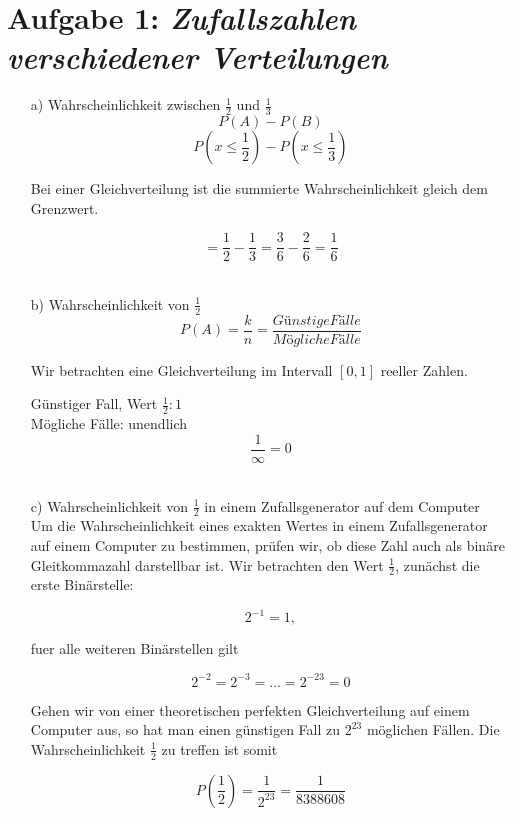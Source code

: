  

\section*{Aufgabe 1: \emph{Zufallszahlen verschiedener Verteilungen}}

\begin{itemize}
\item[a)] Wahrscheinlichkeit zwischen $\frac{1}{2}$ und $\frac{1}{3}$ \\

\[
P\left(A\right) - P\left(B\right)
\]
\[
P\left(x \le \frac{1}{2}\right) - P\left(x \le \frac{1}{3}\right)
\]

Bei einer Gleichverteilung ist die summierte Wahrscheinlichkeit gleich dem Grenzwert.

\[
= \frac{1}{2} - \frac{1}{3} = \frac{3}{6} - \frac{2}{6} = \frac{1}{6}
\]
 \\

\item[b)] Wahrscheinlichkeit von $\frac{1}{2}$ \\

\[
P(A) = \frac{k}{n} = \frac{Günstige Fälle} {Mögliche Fälle}
\]

Wir betrachten eine Gleichverteilung im Intervall $[0,1]$ reeller Zahlen.

Günstiger Fall, Wert $\frac{1}{2}: 1$ \\
Mögliche Fälle: unendlich
\[
\frac{1}{\infty} = 0
\]
\\

\item[c)] Wahrscheinlichkeit von $\frac{1}{2}$ in einem Zufallsgenerator auf dem Computer \\

Um die Wahrscheinlichkeit eines exakten Wertes in einem Zufallsgenerator auf einem
Computer zu bestimmen, pr\"ufen wir, ob diese Zahl auch als bin\"are Gleitkommazahl darstellbar ist.
Wir betrachten den Wert $\frac{1}{2}$, zun\"achst die erste Bin\"arstelle:

\[
 2^{-1} = 1,
\]

fuer alle weiteren Binärstellen gilt

\[
2^{-2} = 2^{-3} = ... = 2^{-23} = 0
\]

Gehen wir von einer theoretischen perfekten Gleichverteilung auf einem Computer aus, 
so hat man einen günstigen Fall zu $2^{23}$ möglichen Fällen.
Die Wahrscheinlichkeit $\frac{1}{2}$ zu treffen ist somit

\[
P\left(\frac{1}{2}\right) = \frac{1}{2^{23}} =\frac{1}{8388608}
\]



\end{itemize}
